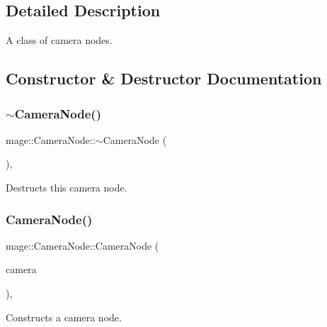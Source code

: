 \subsection{Detailed Description}
A class of camera nodes. 

\subsection{Constructor \& Destructor Documentation}
\hypertarget{classmage_1_1_camera_node_ac6612668e7b9f829e371794d422d357f}{}\label{classmage_1_1_camera_node_ac6612668e7b9f829e371794d422d357f} 
\subsubsection{\texorpdfstring{$\sim$\+Camera\+Node()}{~CameraNode()}}
{\footnotesize\ttfamily mage\+::\+Camera\+Node\+::$\sim$\+Camera\+Node (\begin{DoxyParamCaption}{ }\end{DoxyParamCaption})\hspace{0.3cm}{\ttfamily [virtual]}, {\ttfamily [default]}}

Destructs this camera node. \hypertarget{classmage_1_1_camera_node_af69c99023f20f22922269866ea377c40}{}\label{classmage_1_1_camera_node_af69c99023f20f22922269866ea377c40} 
\subsubsection{\texorpdfstring{Camera\+Node()}{CameraNode()}\hspace{0.1cm}{\footnotesize\ttfamily [1/3]}}
{\footnotesize\ttfamily mage\+::\+Camera\+Node\+::\+Camera\+Node (\begin{DoxyParamCaption}\item[{\hyperlink{namespacemage_a3316d7143a973e37adf1110f2e80ca31}{Unique\+Ptr}$<$ \hyperlink{classmage_1_1_camera}{Camera} $>$ \&\&}]{camera }\end{DoxyParamCaption})\hspace{0.3cm}{\ttfamily [explicit]}, {\ttfamily [protected]}}

Constructs a camera node.

